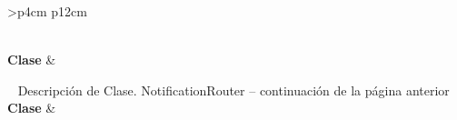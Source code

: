  \label{sec:descripcion_notificationrouter}
\begin{longtable}{
    >{}p{4cm}
    p{12cm}
    }
    \caption{Descripción de Clase. NotificationRouter} \label{table:descripcion_notificationrouter} \\
    \toprule
    \textbf{Clase} &  \\
    \endfirsthead
    
    {{ \tablename\ \thetable{} Descripción de Clase. NotificationRouter -- continuación de la página anterior}} \\
    \toprule
    \textbf{Clase} &  \\
    \midrule
    \endhead
    
    \midrule
     \\ 
    \endfoot
    
    \bottomrule
    \endlastfoot
    

\end{longtable}
